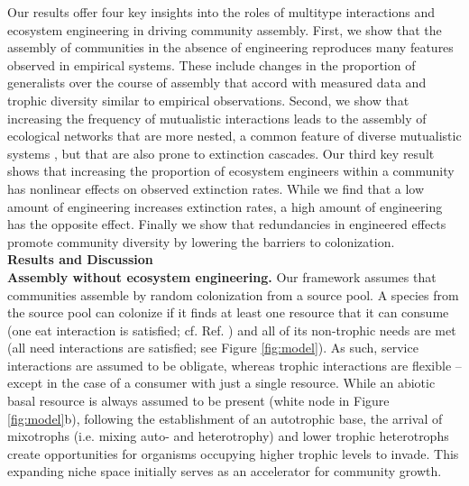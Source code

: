 \documentclass[twocolumn,preprintnumbers,amsmath,amssymb,superscriptaddress,linenumbers]{revtex4-1}
\begin{document}
Our results offer four key insights into the roles of multitype interactions and ecosystem engineering in driving community assembly.
First, we show that the assembly of communities in the absence of engineering reproduces many features observed in empirical systems.
These include changes in the proportion of generalists over the course of assembly that accord with measured data and trophic diversity similar to empirical observations. %
Second, we show that increasing the frequency of mutualistic interactions leads to the assembly of ecological networks that are more nested, a common feature of diverse mutualistic systems \cite{Bascompte2003}, but that are also prone to extinction cascades.
Our third key result shows that increasing the proportion of ecosystem engineers within a community has nonlinear effects on observed extinction rates.
While we find that a low amount of engineering increases extinction rates, a high amount of engineering has the opposite effect.
Finally we show that redundancies in engineered effects promote community diversity by lowering the barriers to colonization.\\

\vspace{0mm}
\noindent \textbf{Results and Discussion}\\
\noindent \textbf{Assembly without ecosystem engineering.}
\noindent Our framework assumes that communities assemble by random colonization from a source pool.
A species from the source pool can colonize if it finds at least one resource that it can consume (one eat interaction is satisfied; cf. Ref. \cite{Gravel2011}) and all of its non-trophic needs are met (all need interactions are satisfied; see Figure \ref{fig:model}).
As such, service interactions are assumed to be obligate, whereas trophic interactions are flexible -- except in the case of a consumer with just a single resource.
While an abiotic basal resource is always assumed to be present (white node in Figure \ref{fig:model}b), following the establishment of an autotrophic base, the arrival of mixotrophs (i.e. mixing auto- and heterotrophy) and lower trophic heterotrophs create opportunities for organisms occupying higher trophic levels to invade.
This expanding niche space initially serves as an accelerator for community growth.
\end{document}
